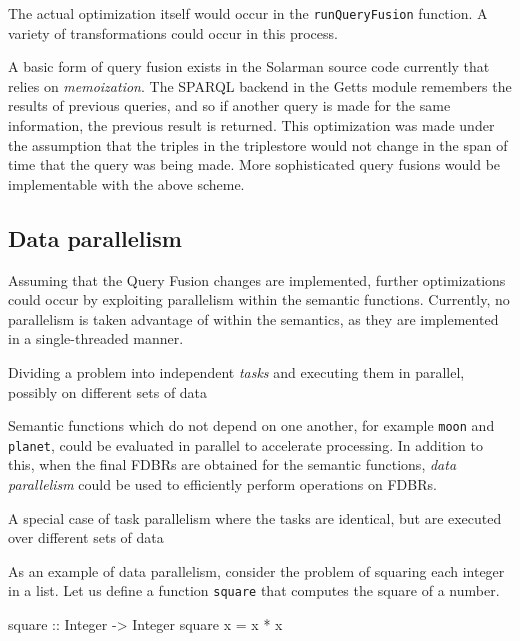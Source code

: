 \documentclass[../main.tex]{subfiles}
\begin{document}
The actual optimization itself would occur in the \texttt{runQueryFusion} function.  A variety of transformations could occur in this process.

A basic form of query fusion exists in the Solarman source code currently that relies on {\em memoization}.  The SPARQL backend in the Getts module remembers the
results of previous queries, and so if another query is made for the same information, the previous result is returned.  This optimization was made
under the assumption that the triples in the triplestore would not change in the span of time that the query was being made.  More sophisticated query fusions
would be implementable with the above scheme.

\subsection{Data parallelism}

Assuming that the Query Fusion changes are implemented, further optimizations could occur by exploiting parallelism within the semantic functions.
Currently, no parallelism is taken advantage of within the semantics, as they are implemented in a single-threaded manner.

\begin{definition}
	Dividing a problem into independent {\em tasks} and executing them in parallel, possibly on different sets of data
\end{definition}

Semantic functions which do not depend on one another, for example \texttt{moon} and \texttt{planet}, could be evaluated in parallel to accelerate processing.
In addition to this, when the final FDBRs are obtained for the semantic functions, {\em data parallelism} could be used to efficiently perform operations
on FDBRs.

\begin{definition}
	A special case of task parallelism where the tasks are identical, but are executed over different sets of data
\end{definition}

As an example of data parallelism, consider the problem of squaring each integer in a list. Let us define a function \texttt{square} that computes the square of a number.

\begin{code}
	square :: Integer -> Integer
	square x = x * x
\end{code}
\end{document}

